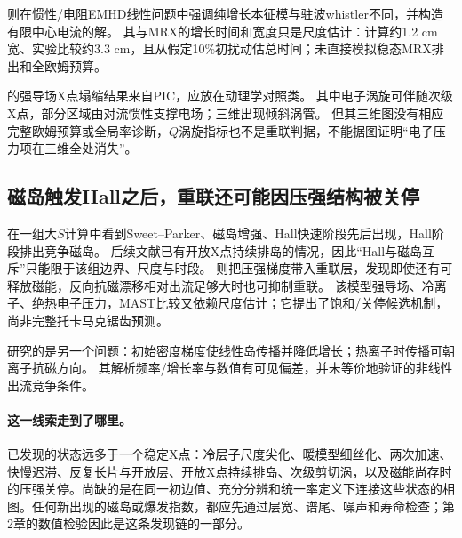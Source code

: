 \citet{L202}则在惯性/电阻EMHD线性问题中强调纯增长本征模与驻波whistler不同，并构造有限中心电流的解。
其与MRX的增长时间和宽度只是尺度估计：计算约1.2 cm宽、实验比较约3.3 cm，且从假定10\%初扰动估总时间；未直接模拟稳态MRX排出和全欧姆预算。

\citet{L230}的强导场X点塌缩结果来自PIC，应放在动理学对照类。
其中电子涡旋可伴随次级X点，部分区域由对流惯性支撑电场；三维出现倾斜涡管。
但其三维图没有相应完整欧姆预算或全局率诊断，$Q$涡旋指标也不是重联判据，不能据图证明“电子压力项在三维全处消失”。

\subsection{磁岛触发Hall之后，重联还可能因压强结构被关停}
\citet{L159}在一组大$S$计算中看到Sweet--Parker、磁岛增强、Hall快速阶段先后出现，Hall阶段排出竞争磁岛。
后续文献已有开放X点持续排岛的情况，因此“Hall与磁岛互斥”只能限于该组边界、尺度与时段。
\citet{L174}则把压强梯度带入重联层，发现即使还有可释放磁能，反向抗磁漂移相对出流足够大时也可抑制重联。
该模型强导场、冷离子、绝热电子压力，MAST比较又依赖尺度估计；它提出了饱和/关停候选机制，尚非完整托卡马克锯齿预测。

\citet{E472}研究的是另一个问题：初始密度梯度使线性岛传播并降低增长；热离子时传播可朝离子抗磁方向。
其解析频率/增长率与数值有可见偏差，并未等价地验证\citet{L174}的非线性出流竞争条件。

\paragraph{这一线索走到了哪里。}已发现的状态远多于一个稳定X点：冷层子尺度尖化、暖模型细丝化、两次加速、快慢迟滞、反复长片与开放层、开放X点持续排岛、次级剪切涡，以及磁能尚存时的压强关停。尚缺的是在同一初边值、充分分辨和统一率定义下连接这些状态的相图。任何新出现的磁岛或爆发指数，都应先通过层宽、谱尾、噪声和寿命检查；第2章的数值检验因此是这条发现链的一部分。
